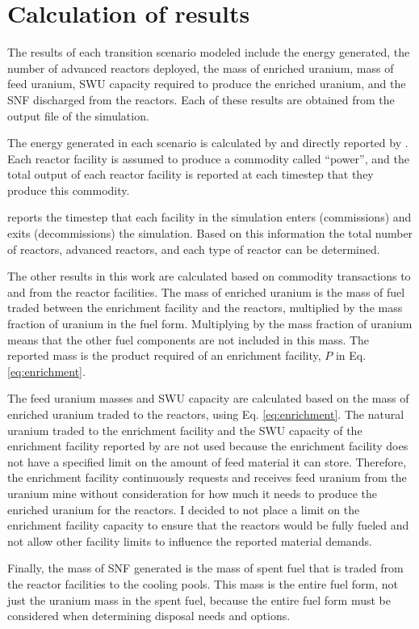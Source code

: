 \section{Calculation of results} \label{sec:results_calc}
The results of each transition scenario modeled include the energy generated, 
the number of advanced reactors deployed, the mass of enriched uranium, 
mass of feed uranium, \gls{SWU} capacity required to produce the enriched 
uranium, and the \gls{SNF} discharged from the reactors. Each of these results 
are obtained from the \Cyclus output file of the simulation. 

The energy generated in each scenario is calculated by and directly 
reported by \Cyclus. Each reactor facility is assumed to produce a 
commodity called ``power'', and the total output of each reactor facility 
is reported at each timestep that they produce this commodity. 

\Cyclus reports the timestep that each facility in the simulation enters 
(commissions) and exits (decommissions) the simulation. Based on 
this information the total number of reactors, advanced reactors, and each 
type of reactor can be determined. 

The other results in this work are calculated based on commodity 
transactions to and from the reactor facilities. The mass of enriched 
uranium is the mass of fuel traded between the enrichment facility and 
the reactors, multiplied by the mass fraction of uranium in the fuel 
form. Multiplying by the mass fraction of uranium means that the other 
fuel components are not included in this mass. The reported mass is the 
product required of an enrichment facility, $P$ in Eq. \ref{eq:enrichment}.

The feed uranium masses and \gls{SWU} capacity are calculated 
based on the mass of enriched uranium traded to the reactors, using 
Eq. \ref{eq:enrichment}. The natural uranium traded to the enrichment 
facility and the \gls{SWU} capacity of the enrichment facility reported by 
\Cyclus are not used because the enrichment facility does not have a 
specified limit on the amount of feed material it can store. Therefore, 
the enrichment facility continuously requests and receives feed 
uranium from the uranium mine without consideration for how much it needs 
to produce the enriched uranium for the reactors. I decided to not place 
a limit on the enrichment facility capacity to ensure that the reactors 
would be fully fueled and not allow other facility limits to influence the 
reported material demands. 

Finally, the mass of \gls{SNF} generated is the mass of spent fuel that is 
traded from the reactor facilities to the cooling pools. This mass is the 
entire fuel form, not just the uranium mass in the spent fuel, because 
the entire fuel form must be considered when determining disposal needs 
and options. 
